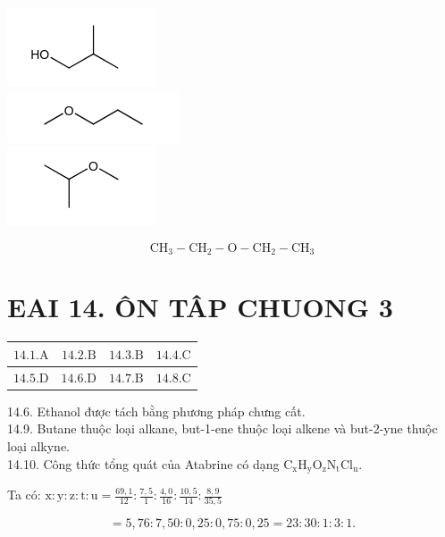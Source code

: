 \documentclass[10pt]{article}
\begin{document}
\includegraphics{smile-0f8d6d57c76317aa72a062030d1d18d40daf14a9}\\
\includegraphics{smile-09ac599a594901e1eb1ad5572fdf6614c9881444}\\
\includegraphics{smile-3d85f430c8220dd35c3f0d0c56bc240f0efa0217}

$$
\mathrm{CH}_{3}-\mathrm{CH}_{2}-\mathrm{O}-\mathrm{CH}_{2}-\mathrm{CH}_{3}
$$

\section*{EAI 14. ÔN TÂP CHUONG 3}
\begin{center}
\begin{tabular}{|c|c|c|c|}
\hline
$14.1 . \mathrm{A}$ & $14.2 . \mathrm{B}$ & $14.3 . \mathrm{B}$ & $14.4 . \mathrm{C}$ \\
\hline
$14.5 . \mathrm{D}$ & $14.6 . \mathrm{D}$ & $14.7 . \mathrm{B}$ & $14.8 . \mathrm{C}$ \\
\hline
\end{tabular}
\end{center}

14.6. Ethanol được tách bằng phương pháp chưng cất.\\
14.9. Butane thuộc loại alkane, but-1-ene thuộc loại alkene và but-2-yne thuộc loại alkyne.\\
14.10. Công thức tổng quát của Atabrine có dạng $\mathrm{C}_{\mathrm{x}} \mathrm{H}_{\mathrm{y}} \mathrm{O}_{\mathrm{z}} \mathrm{N}_{\mathrm{t}} \mathrm{Cl}_{\mathrm{u}}$.

Ta có: $\mathrm{x}: \mathrm{y}: \mathrm{z}: \mathrm{t}: \mathrm{u}=\frac{69,1}{12}: \frac{7,5}{1}: \frac{4,0}{16}: \frac{10,5}{14}: \frac{8,9}{35,5}$

$$
=5,76: 7,50: 0,25: 0,75: 0,25=23: 30: 1: 3: 1 .
$$
\end{document}
